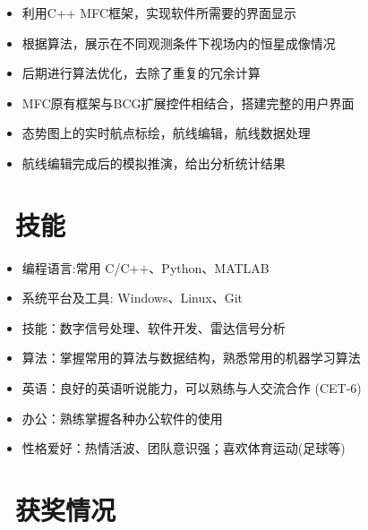 \documentclass{resume}
\begin{document}
\begin{itemize}[topsep = 0 pt, partopsep = 0pt]
  \item 利用C++ MFC框架，实现软件所需要的界面显示
  \item 根据算法，展示在不同观测条件下视场内的恒星成像情况
  \item 后期进行算法优化，去除了重复的冗余计算
\end{itemize}

\begin{itemize}[topsep = 0 pt, partopsep = 0pt]
  \item MFC原有框架与BCG扩展控件相结合，搭建完整的用户界面
  \item 态势图上的实时航点标绘，航线编辑，航线数据处理
  \item 航线编辑完成后的模拟推演，给出分析统计结果
\end{itemize}



\section{\faCogs\ 技能}
\begin{itemize}[parsep=0.5ex]
  \item 编程语言:常用 C/C++、Python、MATLAB  
  \item 系统平台及工具: Windows、Linux、Git
  \item 技能：数字信号处理、软件开发、雷达信号分析
  \item 算法：掌握常用的算法与数据结构，熟悉常用的机器学习算法
  \item 英语：良好的英语听说能力，可以熟练与人交流合作 (CET-6)
  \item  办公：熟练掌握各种办公软件的使用
  \item  性格爱好：热情活波、团队意识强；喜欢体育运动(足球等)
\end{itemize}

\section{\faHeartO\ 获奖情况}
\end{document}
